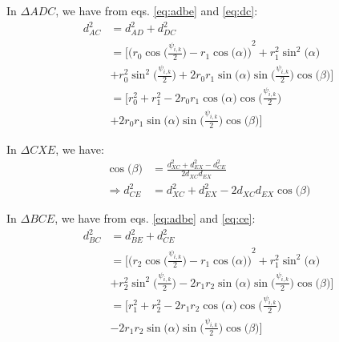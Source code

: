         In $\Delta ADC$, we have from eqs. \eqref{eq:adbe} and \eqref{eq:dc}:
        \begin{equation}
        \label{eq:ac}
            \begin{aligned}
                d_{AC}^2 &= d_{AD}^2 + d_{DC}^2\\
                &= \Bigg[ {\Big(r_0  \cos \Big(\displaystyle\frac{\psi_{i,k}}{2}\Big) - r_1  \cos \big(\alpha\big) \Big)}^2 + r_1^2  \sin^2 \big( \alpha \big)\\
                &+ r_0^2  \sin^2 \Big(\displaystyle\frac{\psi_{i,k}}{2}\Big) + 2  r_0  r_1 \sin \big( \alpha \big)  \sin \Big(\displaystyle\frac{\psi_{i,k}}{2}\Big)  \cos \big( \beta \big) \Bigg]\\
                &= \Bigg[ r_0^2 + r_1^2 - 2  r_0  r_1  \cos \big( \alpha \big)  \cos \Big(\displaystyle\frac{\psi_{i,k}}{2}\Big)\\
                &+ 2  r_0  r_1 \sin \big( \alpha \big)  \sin \Big(\displaystyle\frac{\psi_{i,k}}{2}\Big)  \cos \big( \beta \big) \Bigg]
            \end{aligned}
        \end{equation}

        In $\Delta CXE$, we have:
        \begin{equation}
        \label{eq:ce}
            \begin{aligned}
                \cos \big( \beta \big) &= \frac{d_{XC}^2 + d_{EX}^2 - d_{CE}^2}{2  d_{XC}  d_{EX}}\\
                \Rightarrow d_{CE}^2 &= d_{XC}^2 + d_{EX}^2 - 2  d_{XC}  d_{EX}  \cos \big( \beta \big)
            \end{aligned}
        \end{equation}

        In $\Delta BCE$, we have from eqs. \eqref{eq:adbe} and \eqref{eq:ce}:
        \begin{equation}
        \label{eq:bc}
            \begin{aligned}
                d_{BC}^2 &= d_{BE}^2 + d_{CE}^2\\
                &= \Bigg[ {\Big(r_2  \cos \Big(\displaystyle\frac{\psi_{i,k}}{2}\Big) - r_1  \cos \big(\alpha\big) \Big)}^2 + r_1^2  \sin^2 \big( \alpha \big)\\
                &+ r_2^2  \sin^2 \Big(\displaystyle\frac{\psi_{i,k}}{2}\Big) - 2  r_1  r_2 \sin \big( \alpha \big)  \sin \Big(\displaystyle\frac{\psi_{i,k}}{2}\Big)  \cos \big( \beta \big) \Bigg]\\
                &= \Bigg[ r_1^2 + r_2^2 - 2  r_1  r_2  \cos \big( \alpha \big)  \cos \Big(\displaystyle\frac{\psi_{i,k}}{2}\Big)\\
                &- 2  r_1  r_2 \sin \big( \alpha \big)  \sin \Big(\displaystyle\frac{\psi_{i,k}}{2}\Big)  \cos \big( \beta \big) \Bigg]
            \end{aligned}
        \end{equation}

